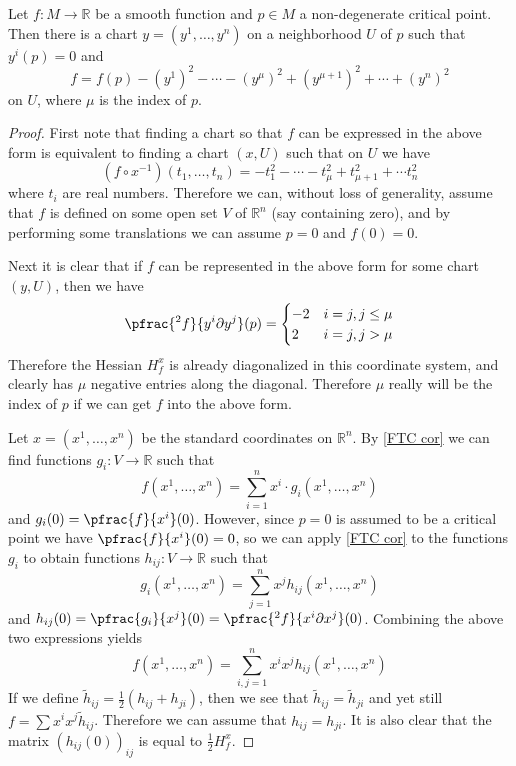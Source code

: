 \begin{lem}
\label{Morse Lemma}
Let $f : M \rightarrow \mathbb R$ be a smooth function and $p \in M$ a non-degenerate critical point. Then there is a chart $y = (y^1,\ldots,y^n)$ on a neighborhood $U$ of $p$ such that $y^i(p) = 0$ and
\[ f = f(p) - (y^1)^2 - \cdots - (y^\mu)^2 + (y^{\mu+1})^2 + \cdots + (y^n)^2 \]
on $U$, where $\mu$ is the index of $p$.
\end{lem}
\begin{proof}
First note that finding a chart so that $f$ can be expressed in the above form is equivalent to finding a chart $(x,U)$ such that on $U$ we have
\[ (f \circ x^{-1})(t_1,\ldots,t_n) = -t_1^2 - \cdots - t_\mu^2 + t_{\mu+1}^2 + \cdots t_n^2 \]
where $t_i$ are real numbers. Therefore we can, without loss of generality, assume that $f$ is defined on some open set $V$ of $\mathbb R^n$ (say containing zero), and by performing some translations we can assume $p=0$ and $f(0)=0$.

Next it is clear that if $f$ can be represented in the above form for some chart $(y,U)$, then we have
\[ \pfrac{^2 f}{y^i \partial y^j}(p) = \begin{cases} -2 & i=j, j \leq \mu \\ 2 & i=j, j > \mu \end{cases} \]
Therefore the Hessian $H_f^x$ is already diagonalized in this coordinate system, and clearly has $\mu$ negative entries along the diagonal. Therefore $\mu$ really will be the index of $p$ if we can get $f$ into the above form.

Let $x=(x^1,\ldots,x^n)$ be the standard coordinates on $\mathbb R^n$. By \cref{FTC cor} we can find functions $g_i : V \rightarrow \mathbb R$ such that
\[ f(x^1,\ldots,x^n) = \sum_{i=1}^n x^i \cdot g_i(x^1,\ldots,x^n) \]
and $g_i(0) = \pfrac{f}{x^i}(0)$. However, since $p=0$ is assumed to be a critical point we have $\pfrac{f}{x^i}(0) = 0$, so we can apply \cref{FTC cor} to the functions $g_i$ to obtain functions $h_{ij} : V \rightarrow \mathbb R$ such that
\[ g_i(x^1,\ldots,x^n) = \sum_{j=1}^n x^j h_{ij}(x^1,\ldots,x^n) \]
and $h_{ij}(0) = \pfrac{g_i}{x^j}(0) = \pfrac{^2 f}{x^i \partial x^j}(0)$. Combining the above two expressions yields
\begin{equation}
\label{quadratic form of f}
f(x^1,\ldots,x^n) = \sum_{i,j=1}^n x^i x^j h_{ij} (x^1,\ldots,x^n)
\end{equation}
If we define $\widetilde{h}_{ij} = \frac{1}{2}(h_{ij} + h_{ji})$, then we see that $\widetilde{h}_{ij} = \widetilde{h}_{ji}$ and yet still $f = \sum x^i x^j\widetilde{h}_{ij}$. Therefore we can assume that $h_{ij} = h_{ji}$. It is also clear that the matrix $(h_{ij}(0))_{ij}$ is equal to $\frac{1}{2} H_f^x$. 


\end{proof}
